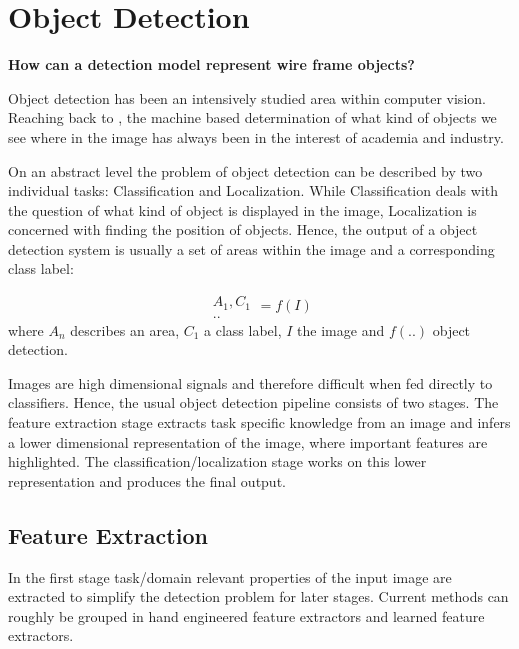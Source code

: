 	\chapter{Object Detection}
	
	\label{sec:object_detection}
	
	\begin{center}
		\textbf{ How can a detection model represent wire frame objects?}
	\end{center}
	
	
	Object detection has been an intensively studied area within computer vision. Reaching back to , the machine based determination of what kind of objects we see where in the image has always been in the interest of academia and industry.
	
	On an abstract level the problem of object detection can be described by two individual tasks: Classification and Localization. While Classification deals with the question of what kind of object is displayed in the image, Localization is concerned with finding the position of objects. Hence, the output of a object detection system is usually a set of areas within the image and a corresponding class label:
	
	$$
	\begin{matrix}
	A_1, C_1\\
	..
	\end{matrix} = f(I)
	$$
	where $A_n$ describes an area, $C_1$ a class label, $I$ the image and $f(..)$ object detection.
	
	Images are high dimensional signals and therefore difficult when fed directly to classifiers. Hence, the usual object detection pipeline consists of two stages. The feature extraction stage extracts task specific knowledge from an image and infers a lower dimensional representation of the image, where important features are highlighted. The classification/localization stage works on this lower representation and produces the final output.
	
	
	
	\section{Feature Extraction}
	
	In the first stage task/domain relevant properties of the input image are extracted to simplify the detection problem for later stages. Current methods can roughly be grouped in hand engineered feature extractors and learned feature extractors.
	
